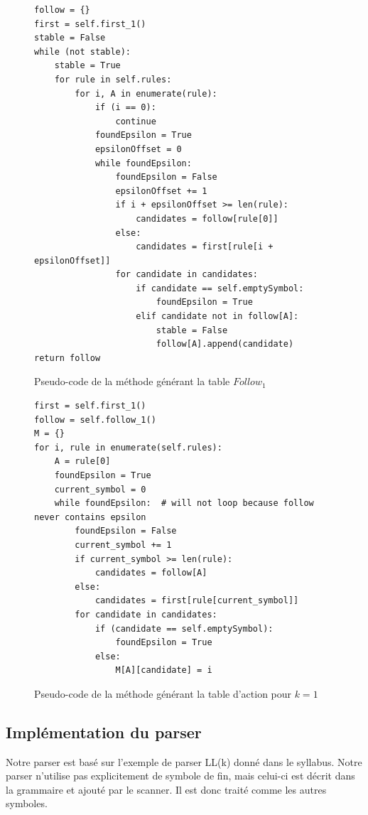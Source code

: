 \documentclass[a4paper,10pt]{article}
\begin{document}
\begin{figure}[H]
\begin{lstlisting}
follow = {}
first = self.first_1()
stable = False
while (not stable):
	stable = True
	for rule in self.rules:
		for i, A in enumerate(rule):
			if (i == 0):
				continue
			foundEpsilon = True
			epsilonOffset = 0
			while foundEpsilon:
				foundEpsilon = False
				epsilonOffset += 1
				if i + epsilonOffset >= len(rule):
					candidates = follow[rule[0]]
				else:
					candidates = first[rule[i + epsilonOffset]]
				for candidate in candidates:
					if candidate == self.emptySymbol:
						foundEpsilon = True
					elif candidate not in follow[A]:
						stable = False
						follow[A].append(candidate)
return follow
\end{lstlisting}
\fontfamily{}
\caption{Pseudo-code de la méthode générant la table $Follow_1$}
\label{lst:follow_1}
\end{figure}

\begin{figure}[H]
\begin{lstlisting}
first = self.first_1()
follow = self.follow_1()
M = {}
for i, rule in enumerate(self.rules):
	A = rule[0]
	foundEpsilon = True
	current_symbol = 0
	while foundEpsilon:  # will not loop because follow never contains epsilon
		foundEpsilon = False
		current_symbol += 1
		if current_symbol >= len(rule):
			candidates = follow[A]
		else:
			candidates = first[rule[current_symbol]]
		for candidate in candidates:
			if (candidate == self.emptySymbol):
				foundEpsilon = True
			else:
				M[A][candidate] = i
\end{lstlisting}
\fontfamily{}
\caption{Pseudo-code de la méthode générant la table d'action pour $k = 1$}
\label{lst:actionTable}
\end{figure}

\subsection{Implémentation du parser}

\label{anx:parserImpl}

Notre parser est basé sur l'exemple de parser LL(k) donné dans le syllabus. Notre parser n'utilise pas explicitement de symbole de fin, mais celui-ci est décrit dans la grammaire et ajouté par le scanner. Il est donc traité comme les autres symboles.
\end{document}
